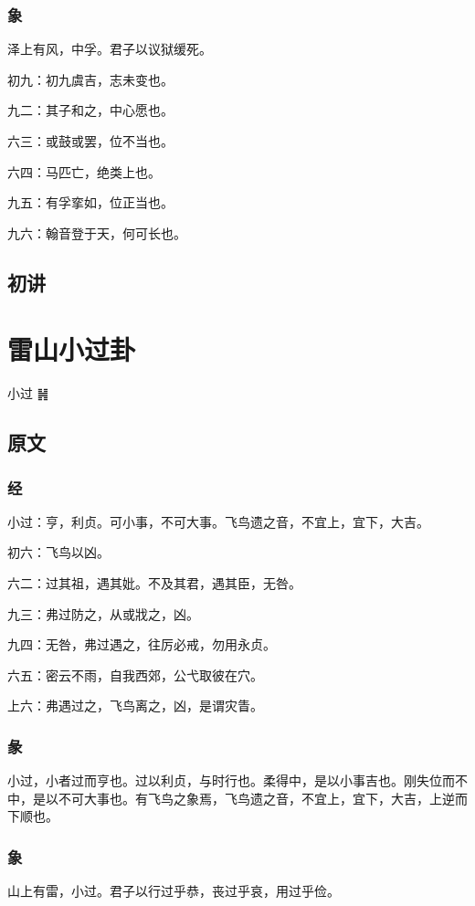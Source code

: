 \documentclass[12pt,oneside]{book}
\begin{document}
\subsection{象}
泽上有风，中孚。君子以议狱缓死。

初九：初九虞吉，志未变也。

九二：其子和之，中心愿也。

六三：或鼓或罢，位不当也。

六四：马匹亡，绝类上也。

九五：有孚挛如，位正当也。

九六：翰音登于天，何可长也。

\section{初讲}


\chapter{雷山小过卦}
小过 {\LARGE ䷽}

\section{原文}
\subsection{经}
小过：亨，利贞。可小事，不可大事。飞鸟遗之音，不宜上，宜下，大吉。

初六：飞鸟以凶。

六二：过其祖，遇其妣。不及其君，遇其臣，无咎。

九三：弗过防之，从或戕之，凶。

九四：无咎，弗过遇之，往厉必戒，勿用永贞。

六五：密云不雨，自我西郊，公弋取彼在穴。

上六：弗遇过之，飞鸟离之，凶，是谓灾眚。

\subsection{彖}
小过，小者过而亨也。过以利贞，与时行也。柔得中，是以小事吉也。刚失位而不中，是以不可大事也。有飞鸟之象焉，飞鸟遗之音，不宜上，宜下，大吉，上逆而下顺也。

\subsection{象}
山上有雷，小过。君子以行过乎恭，丧过乎哀，用过乎俭。
\end{document}
